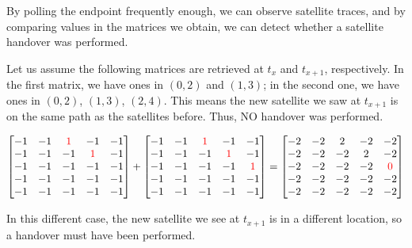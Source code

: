 \documentclass[IN,11pt,twoside,openright,idp,english]{tumthesis}
\begin{document}
By polling the endpoint frequently enough, we can observe satellite traces, and by comparing values in the matrices we obtain, we can detect whether a satellite handover was performed.

Let us assume the following matrices are retrieved at $ t_x $ and $ t_{x+1} $, respectively. 
In the first matrix, we have ones in $ (0,2) $ and $ (1,3) $; in the second one, we have ones in $ (0,2) $, $ (1,3) $, $ (2,4) $. This means the new satellite we saw at $ t_{x+1} $ is on the same path as the satellites before. Thus, NO handover was performed. \vspace{10mm}

$\begin{bmatrix}
-1 & -1 & \color{red}1 &           -1 & -1 \\
-1 & -1 &           -1 & \color{red}1 & -1 \\
-1 & -1 &           -1 &           -1 & -1 \\
-1 & -1 &           -1 &           -1 & -1 \\
-1 & -1 &           -1 &           -1 & -1 \\ 
\end{bmatrix}
+
\begin{bmatrix}
-1 & -1 & \color{red}1 &           -1 &           -1 \\
-1 & -1 &           -1 & \color{red}1 &           -1 \\
-1 & -1 &           -1 &           -1 & \color{red}1 \\
-1 & -1 &           -1 &           -1 &           -1 \\
-1 & -1 &           -1 &           -1 &           -1 \\
\end{bmatrix}
=
\begin{bmatrix}
-2 & -2 & 2 &  -2 &           -2 \\
-2 & -2 & -2 &  2 &           -2 \\
-2 & -2 & -2 & -2 & \color{red}0 \\
-2 & -2 & -2 & -2 &            -2 \\
-2 & -2 & -2 & -2 &            -2 \\
\end{bmatrix}$ \vspace{10mm}

In this different case, the new satellite we see at $ t_{x+1} $ is in a different location, so a handover must have been performed. \vspace{10mm}
\end{document}
